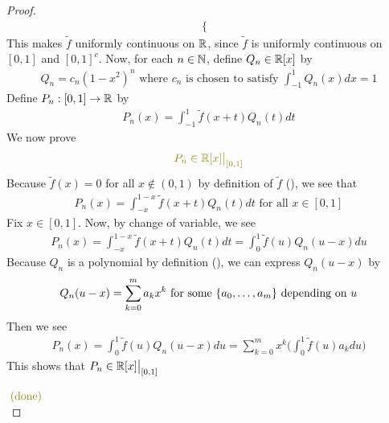 \documentclass{report}
\begin{document}
\begin{proof}
\begin{align}
\begin{cases}
\end{cases}
\end{align}
This makes $\tilde{f}$ uniformly continuous on $\mathbb{R}$, since  $\tilde{f}$ is uniformly continuous on $[0,1]$ and $[0,1]^c$. Now, for each $n\in\mathbb{N}$, define $Q_n \in \mathbb{R}[x]$ by 
\begin{align}
\label{tse3}
Q_n=c_n(1-x^2)^n\text{ where $c_n$ is chosen to satisfy }\int_{-1}^1 Q_n(x)dx=1
\end{align}
Define $P_n:[0,1]\rightarrow \mathbb{R}$ by 
\begin{align*}
P_n(x)=\int_{-1}^1 \tilde{f} (x+t)Q_n(t)dt
\end{align*}
We now prove 
\begin{align*}
\olive{P_n \in \R[x]\big|_{[0,1]}}
\end{align*}
Because $\tilde{f}(x)=0$ for all $x \not \in (0,1)$ by definition of $\tilde{f} $ (), we see that 
\begin{align}
\label{tse4}
P_n(x)=\int_{-x}^{1-x}\tilde{f}(x+t)Q_n(t)dt \text{ for all }x \in [0,1]
\end{align}
Fix $x \in [0,1]$. Now, by change of variable, we see 
\begin{align*}
P_n(x)=\int_{-x}^{1-x} \tilde{f}(x+t)Q_n(t)dt=\int_{0}^1 \tilde{f}(u)Q_n(u-x)du  
\end{align*}
Because $Q_n$ is a polynomial by definition (), we can express $Q_n(u-x)$ by 
\begin{align*}
Q_n(u-x)=\sum_{k=0}^{m} a_k x^k\text{ for some $\{ a_0,\dots ,a_m \}$ depending on $u$}
\end{align*}
Then we see 
\begin{align*}
  P_n(x)=\int_0^1 \tilde{f}(u)Q_n(u-x)du= \sum_{k=0}^m x^k \Big( 
\int_0^1 \tilde{f}(u) a_kdu
  \Big)  
\end{align*}
This shows that $P_n \in\mathbb{R}[x]\big|_{[0,1]}$

$\odone$\\



\end{proof}
\end{document}
